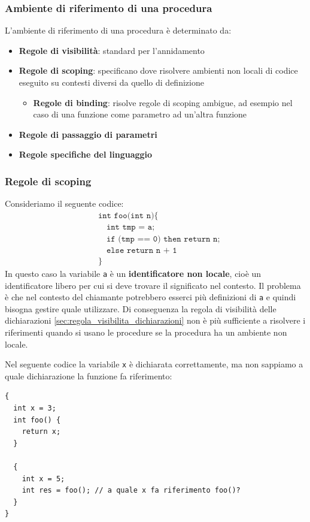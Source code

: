 \documentclass[a4paper]{article}
\begin{document}
\subsubsection{Ambiente di riferimento di una procedura}
L'ambiente di riferimento di una procedura è determinato da:
\begin{itemize}
  \item \textbf{Regole di visibilità}: standard per l'annidamento
  \item \textbf{Regole di scoping}: specificano dove risolvere ambienti non locali di codice
    eseguito su contesti diversi da quello di definizione
    \begin{itemize}
      \item \textbf{Regole di binding}: risolve regole di scoping ambigue, ad
        esempio nel caso di una funzione come parametro ad un'altra funzione
    \end{itemize}
  \item \textbf{Regole di passaggio di parametri}
  \item \textbf{Regole specifiche del linguaggio}
\end{itemize}

\subsubsection{Regole di scoping}
Consideriamo il seguente codice:
\[
  \begin{aligned}
    &\texttt{int foo(int n)}
    \texttt{\{}\\
    &\quad \texttt{int tmp = a;}\\
    &\quad \texttt{if (tmp == 0) then return n;}\\
    &\quad \texttt{else return n + 1 }\\
    &\texttt{\}}
  \end{aligned}
\] 
In questo caso la variabile \texttt{a} è un \textbf{identificatore non locale}, cioè
un identificatore libero per cui si deve trovare il significato nel contesto.
Il problema è che nel contesto del chiamante potrebbero esserci più definizioni
di \texttt{a} e quindi bisogna gestire quale utilizzare.
Di conseguenza la regola di visibilità delle dichiarazioni
\ref{sec:regola_visibilita_dichiarazioni} non è più sufficiente a risolvere i riferimenti
quando si usano le procedure se la procedura ha un ambiente non locale.

\vspace{1em}
\noindent
\begin{Example}{}{}
  Nel seguente codice la variabile \texttt{x} è dichiarata correttamente, ma non
  sappiamo a quale dichiarazione la funzione fa riferimento:
\begin{lstlisting}
{
  int x = 3;
  int foo() {
    return x;
  }

  {
    int x = 5;
    int res = foo(); // a quale x fa riferimento foo()?
  }
}
\end{lstlisting}
\end{Example}
\end{document}
